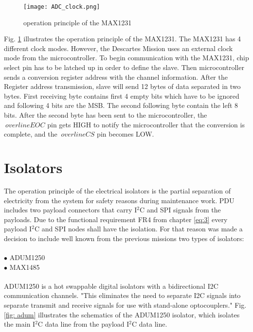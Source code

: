   
 
  \begin{figure}[h]
  	\centering
  	\texttt{[image: ADC\_clock.png]}
  	\caption{operation principle of the MAX1231 \cite{25}}
  	\label{fig: adc}
  \end{figure} 
 
 Fig. \ref{fig: adc} illustrates the operation principle of the MAX1231. The MAX1231 has 4 different clock modes. However, the Descartes Mission uses an external clock mode from the microcontroller. To begin communication with the MAX1231, chip select pin has to be latched up in order to define the slave. Then microcontroller sends a conversion register address with the channel information. After the Register address transmission, slave will send 12 bytes of data separated in two bytes. First receiving byte contains first 4 empty bits which have to be ignored and following 4 bits are the MSB. The second following byte contain the left 8 bits. After the second byte has been sent to the microcontroller, the $ \ overline {EOC} $ pin gets HIGH to notify the microcontroller that the conversion is complete, and the $ \ overline {CS} $ pin becomes LOW.
 
 \section{Isolators}
 
The operation principle of the electrical isolators is the partial separation of electricity from the system for safety reasons during maintenance work. PDU includes two payload connectors that carry I$^2$C and SPI signals from the payloads. Due to the functional requirement FR4 from chapter \ref{eq:3} every payload I$^2$C and SPI nodes shall have the isolation. For that reason was made a decision to include well known from the previous missions two types of isolators:\\ \\

$\bullet$ ADUM1250\\
$\bullet$ MAX1485\\ \\

ADUM1250 \cite{30} is a hot swappable digital isolators with a bidirectional I2C communication channels. "This eliminates the need to separate I2C signals into separate transmit and receive signals for use with stand-alone optocouplers." Fig. \ref{fig: adum} illustrates the schematics of the ADUM1250 isolator, which isolates the main I$^2$C data line from the payload I$^2$C data line.

